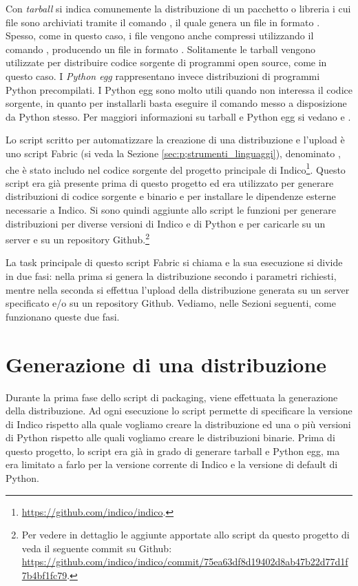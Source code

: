     Con \textit{tarball} si indica comunemente la distribuzione di un pacchetto o libreria i cui file sono archiviati tramite il comando , il quale genera un file in formato . Spesso, come in questo caso, i file  vengono anche compressi utilizzando il comando , producendo un file in formato . Solitamente le tarball vengono utilizzate per distribuire codice sorgente di programmi open source, come in questo caso. I \textit{Python egg} rappresentano invece distribuzioni di programmi Python precompilati. I Python egg sono molto utili quando non interessa il codice sorgente, in quanto per installarli basta eseguire il comando  messo a disposizione da Python stesso. Per maggiori informazioni su tarball e Python egg si vedano \cite{scholz:egg} e \cite{wiki:tar}.
    
    Lo script scritto per automatizzare la creazione di una distribuzione e l'upload è uno script Fabric (si veda la Sezione \ref{sec:p;strumenti_linguaggi}), denominato , che è stato includo nel codice sorgente del progetto principale di Indico\footnote{\url{https://github.com/indico/indico}.}. Questo script era già presente prima di questo progetto ed era utilizzato per generare distribuzioni di codice sorgente e binario e per installare le dipendenze esterne necessarie a Indico. Si sono quindi aggiunte allo script le funzioni per generare distribuzioni per diverse versioni di Indico e di Python e per caricarle su un server e su un repository Github.\footnote{Per vedere in dettaglio le aggiunte apportate allo script da questo progetto di veda il seguente commit su Github: \url{https://github.com/indico/indico/commit/75ea63df8d19402d8ab47b22d77d1f7b4bf1fc79}.}
    
    La task principale di questo script Fabric si chiama  e la sua esecuzione si divide in due fasi: nella prima si genera la distribuzione secondo i parametri richiesti, mentre nella seconda si effettua l'upload della distribuzione generata su un server specificato e/o su un repository Github. Vediamo, nelle Sezioni seguenti, come funzionano queste due fasi.
    
    \section{Generazione di una distribuzione} \label{sec:dp;generazione_distribuzione}
    
        Durante la prima fase dello script di packaging, viene effettuata la generazione della distribuzione. Ad ogni esecuzione lo script permette di specificare la versione di Indico rispetto alla quale vogliamo creare la distribuzione ed una o più versioni di Python rispetto alle quali vogliamo creare le distribuzioni binarie. Prima di questo progetto, lo script era già in grado di generare tarball e Python egg, ma era limitato a farlo per la versione corrente di Indico e la versione di default di Python.
        
